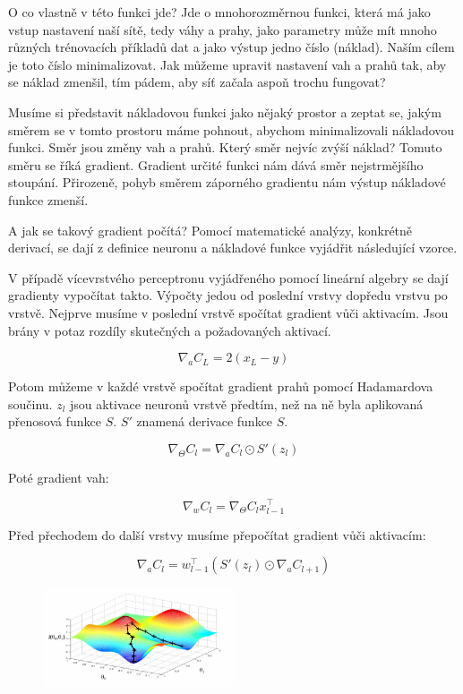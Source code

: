 \documentclass[a4paper,11pt, oneside]{book} \usepackage[czech]{babel}
\begin{document}
	O co vlastně v této funkci jde? Jde o mnohorozměrnou funkci, která má jako
	vstup nastavení naší sítě, tedy váhy a prahy, jako parametry může mít
	mnoho různých trénovacích příkladů dat a jako výstup jedno číslo (náklad).
	Naším cílem je toto číslo minimalizovat. Jak můžeme upravit nastavení vah a prahů tak,
	aby se náklad zmenšil, tím pádem, aby síť začala aspoň trochu fungovat?

	Musíme si představit nákladovou funkci jako nějaký prostor a zeptat se, jakým směrem se v tomto
	prostoru máme pohnout, abychom minimalizovali nákladovou funkci. Směr jsou
	změny vah a prahů.
	Který směr nejvíc zvýší náklad? Tomuto směru se říká gradient. Gradient určité funkci
	nám dává směr nejstrmějšího stoupání. Přirozeně, pohyb směrem záporného gradientu nám výstup nákladové
	funkce zmenší.

	A jak se takový gradient počítá? Pomocí matematické analýzy, konkrétně derivací, se dají
	z definice neuronu a nákladové funkce vyjádřit následující vzorce.

	V případě vícevrstvého perceptronu vyjádřeného pomocí lineární algebry se dají gradienty
	vypočítat takto. Výpočty jedou od poslední vrstvy dopředu vrstvu po vrstvě.
	Nejprve musíme v poslední vrstvě spočítat gradient vůči aktivacím.
	Jsou brány v potaz rozdíly skutečných a požadovaných aktivací.

	\[ \nabla_{a} C_L = 2 (x_L - y)\]

	Potom můžeme v každé vrstvě spočítat gradient prahů pomocí Hadamardova součinu.
	\(z_l\) jsou aktivace neuronů vrstvě předtím, než na ně byla aplikovaná přenosová funkce \(S\).
	\(S'\) znamená derivace funkce \(S\).

	\[ \nabla_\Theta C_l = \nabla_{a} C_l \odot S'(z_l) \]

	Poté gradient vah:

	\[ \nabla_w C_l = \nabla_\Theta C_l x_{l-1}^\top \]

	Před přechodem do další vrstvy musíme přepočítat gradient vůči aktivacím:

	\[ \nabla_{a} C_l = w_{l-1}^\top (S'(z_{l}) \odot \nabla_a C_{l+1})\]


	\begin{figure} %
		\centering
		\includegraphics[width=0.5\textwidth]{img/gradient-descent.png}
		\label{fig:gradient-descent}
	\end{figure}
\end{document}
